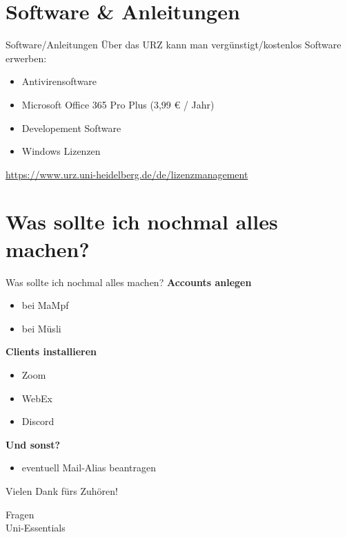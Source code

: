 
\section{Software \& Anleitungen}
\begin{frame}{Software/Anleitungen}
    Über das URZ kann man vergünstigt/kostenlos Software erwerben:
    \begin{itemize}
        \item Antivirensoftware \pause
        \item Microsoft Office 365 Pro Plus (3,99 € / Jahr) \pause
        \item Developement Software \pause
        \item Windows Lizenzen \pause
    \end{itemize}
    \url{https://www.urz.uni-heidelberg.de/de/lizenzmanagement}
\end{frame}


\section{Was sollte ich nochmal alles machen?}
\begin{frame}{Was sollte ich nochmal alles machen?}
	\textbf{Accounts anlegen}
	\normalsize
	\begin{itemize}
		\item bei MaMpf
		\item bei Müsli
	\end{itemize}
	\textbf{Clients installieren}
	\normalsize
	\begin{itemize}
		\item Zoom
		\item WebEx
		\item Discord
	\end{itemize}
	\textbf{Und sonst?}
	\normalsize
	\begin{itemize}
		\item eventuell Mail-Alias beantragen
	\end{itemize}
\end{frame}

\begin{frame}{Vielen Dank fürs Zuhören!}
	\vfill
	\begin{center}
		\Huge Fragen \\[3.5pt]
		\normalsize Uni-Essentials
	\end{center}
\end{frame}



